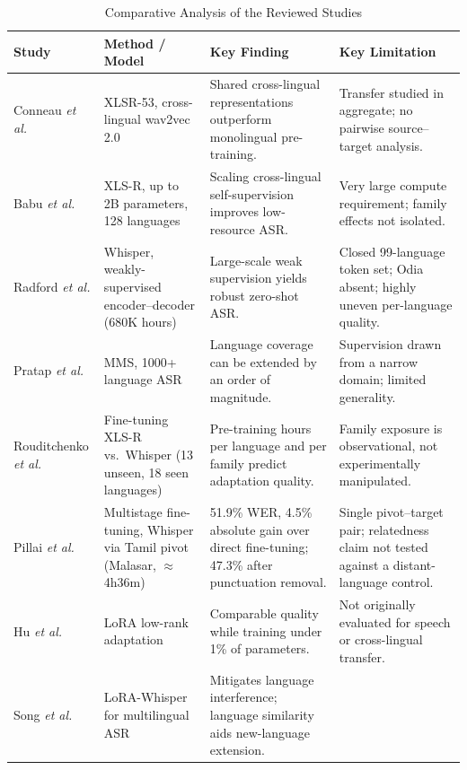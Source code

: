 \documentclass[conference]{IEEEtran}
\begin{document}
\begin{table}[!t]
\caption{Comparative Analysis of the Reviewed Studies}
\label{tab:comparison}
\centering
\renewcommand{\arraystretch}{1.15}
\scriptsize
\begin{tabular}{|p{2.5cm}|p{4.2cm}|p{4.9cm}|p{4.9cm}|}
\hline
\textbf{Study} & \textbf{Method / Model} &
\textbf{Key Finding} & \textbf{Key Limitation} \\
\hline
Conneau \emph{et al.} \cite{conneau2021xlsr} &
XLSR-53, cross-lingual wav2vec 2.0 &
Shared cross-lingual representations outperform monolingual pre-training. &
Transfer studied in aggregate; no pairwise source--target analysis. \\
\hline
Babu \emph{et al.} \cite{babu2022xlsr} &
XLS-R, up to 2B parameters, 128 languages &
Scaling cross-lingual self-supervision improves low-resource ASR. &
Very large compute requirement; family effects not isolated. \\
\hline
Radford \emph{et al.} \cite{radford2023whisper} &
Whisper, weakly-supervised encoder--decoder (680K hours) &
Large-scale weak supervision yields robust zero-shot ASR. &
Closed 99-language token set; Odia absent; highly uneven per-language quality. \\
\hline
Pratap \emph{et al.} \cite{pratap2024mms} &
MMS, 1000+ language ASR &
Language coverage can be extended by an order of magnitude. &
Supervision drawn from a narrow domain; limited generality. \\
\hline
Rouditchenko \emph{et al.} \cite{rouditchenko2023unseen} &
Fine-tuning XLS-R vs.\ Whisper (13 unseen, 18 seen languages) &
Pre-training hours per language and per family predict adaptation quality. &
Family exposure is observational, not experimentally manipulated. \\
\hline
Pillai \emph{et al.} \cite{pillai2026multistage} &
Multistage fine-tuning, Whisper via Tamil pivot (Malasar, $\approx$4h36m) &
51.9\% WER, 4.5\% absolute gain over direct fine-tuning; 47.3\% after punctuation removal. &
Single pivot--target pair; relatedness claim not tested against a distant-language control. \\
\hline
Hu \emph{et al.} \cite{hu2022lora} &
LoRA low-rank adaptation &
Comparable quality while training under 1\% of parameters. &
Not originally evaluated for speech or cross-lingual transfer. \\
\hline
Song \emph{et al.} \cite{song2024lorawhisper} &
LoRA-Whisper for multilingual ASR &
Mitigates language interference; language similarity aids new-language extension. &

\end{tabular}
\end{table}
\end{document}
